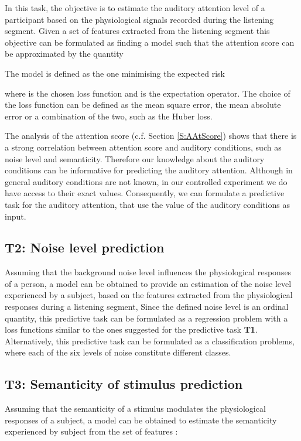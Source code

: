 \documentclass{article}
\begin{document}
In this task, the objective is to estimate the auditory attention level  of a participant based on the physiological signals recorded during the listening segment. Given a set of features  extracted from the listening segment this objective can be formulated as finding a model  such that the attention score can be approximated by the quantity

The model  is defined as the one minimising the expected risk 

where  is the chosen loss function and  is the expectation operator. The choice of the loss function can be defined as the mean square error, the mean absolute error or a combination of the two, such as the Huber loss.



The analysis of the attention score (c.f. Section \ref{S:AAtScore}) shows that there is a strong correlation between attention score and auditory conditions, such as noise level and semanticity. Therefore our knowledge about the auditory conditions can be informative for predicting the auditory attention. Although in general auditory conditions are not known, in our controlled experiment we do have access to their exact values. Consequently, we can formulate a predictive task for the auditory attention, that use the value of the auditory conditions as input.



\subsection{\textbf{T2}: Noise level prediction}
\label{ss:T2}
Assuming that the background noise level influences the physiological responses of a person, a model  can be obtained to provide an estimation  of the noise level experienced by a subject, based on the features extracted from the physiological responses during a listening segment, 
Since the defined noise level is an ordinal quantity, this predictive task can be formulated as a regression problem with a loss functions similar to the ones suggested for the predictive task \textbf{T1}. Alternatively, this predictive task can be formulated as a classification problems, where each of the six levels of noise constitute different classes.

\subsection{\textbf{T3}: Semanticity of stimulus prediction}
\label{ss:T3}
Assuming that the semanticity of a stimulus  modulates the physiological responses of a subject, a model  can be obtained to estimate the semanticity experienced by subject from the set of features :
\end{document}
